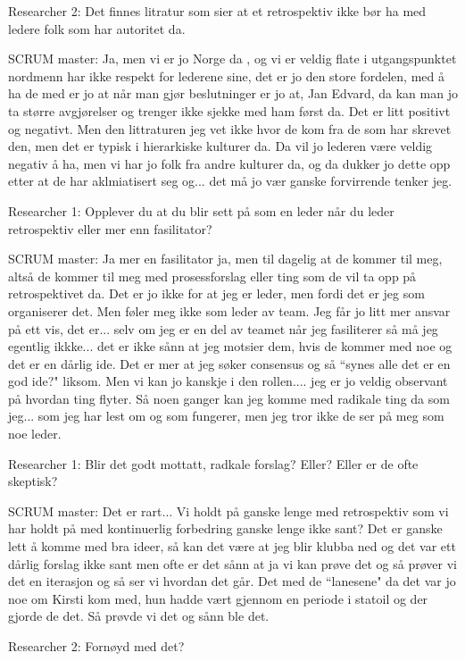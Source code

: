 \documentclass[12pt, a4paper]{report}
\begin{document}
Researcher 2: Det finnes litratur som sier at et retrospektiv ikke bør ha med ledere folk som har autoritet da.

SCRUM master: Ja, men vi er jo Norge da , og vi er veldig flate i utgangspunktet nordmenn har ikke respekt for lederene sine, det er jo den store fordelen, med å ha de med er jo at når man gjør beslutninger er jo at, Jan Edvard, da kan man jo ta større avgjørelser og trenger ikke sjekke med ham først da. Det er litt positivt og negativt. Men den littraturen jeg vet ikke hvor de kom fra de som har skrevet den, men det er typisk i hierarkiske kulturer da. Da vil jo lederen være veldig negativ å ha, men vi har jo folk fra andre kulturer da, og da dukker jo dette opp etter at de har aklmiatisert seg og... det må jo vær ganske forvirrende tenker jeg. 

Researcher 1: Opplever du at du blir sett på som en leder når du leder retrospektiv eller mer enn fasilitator?

SCRUM master: Ja mer en fasilitator ja, men til dagelig at de kommer til meg, altså de kommer til meg med prosessforslag eller ting som de vil ta opp på retrospektivet da. Det er jo ikke for at jeg er leder, men fordi det er jeg som organiserer det. Men føler meg ikke som leder av team. 
Jeg får jo litt mer ansvar på ett vis, det er... selv om jeg er en del av teamet når jeg fasiliterer så må jeg egentlig ikkke... det er ikke sånn at jeg motsier dem, hvis de kommer med noe og det er en dårlig ide. Det er mer at jeg søker consensus og så ``synes alle det er en god ide?" liksom. Men vi kan jo kanskje i den rollen.... jeg er jo veldig observant på hvordan ting flyter. Så noen ganger kan jeg komme med radikale ting da som jeg... som jeg har lest om og som fungerer, men jeg tror ikke de ser på meg som noe leder.

Researcher 1: Blir det godt mottatt, radkale forslag? Eller? Eller er de ofte skeptisk?

SCRUM master: Det er rart... Vi holdt på ganske lenge med retrospektiv som vi har holdt på med kontinuerlig forbedring ganske lenge ikke sant? Det er ganske lett å komme med bra ideer, så kan det være at jeg blir klubba ned og det var ett dårlig forslag ikke sant men ofte er det sånn at ja vi kan prøve det og så prøver vi det en iterasjon og så ser vi hvordan det går. Det med de ``lanesene" da det var jo noe om Kirsti kom med, hun hadde vært gjennom en periode i statoil og der gjorde de det. Så prøvde vi det og sånn ble det.

Researcher 2: Fornøyd med det?
\end{document}
